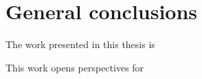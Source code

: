 
\chapter*{General conclusions}

The work presented in this thesis is 

\begin{center}
\end{center}

This work opens perspectives for 

\vfill
\begin{center}
\end{center}
\vfill\vfill
